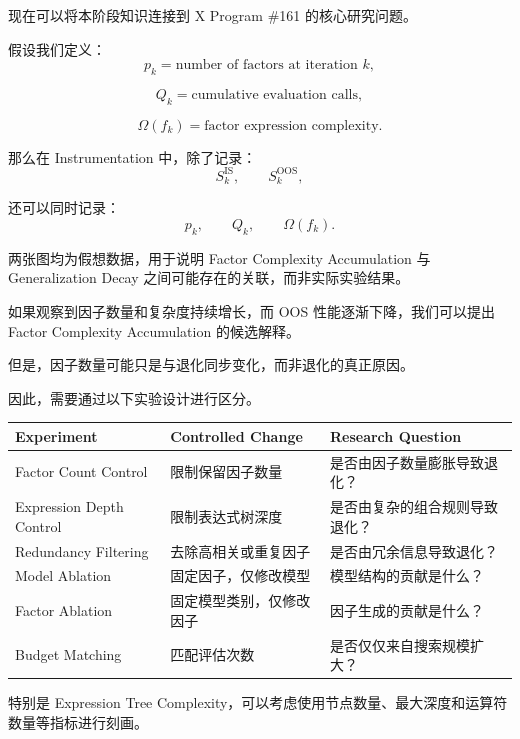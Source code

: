 现在可以将本阶段知识连接到 X Program \#161 的核心研究问题。

假设我们定义：
\[p_k=\text{number of factors at iteration }k,\]

\[Q_k=\text{cumulative evaluation calls},\]

\[\Omega(f_k)=\text{factor expression complexity}.\]

那么在 Instrumentation 中，除了记录：
\[S_k^{\mathrm{IS}},
\qquad
S_k^{\mathrm{OOS}},\]

还可以同时记录：
\[p_k,\qquad Q_k,\qquad\Omega(f_k).\]



两张图均为假想数据，用于说明 Factor Complexity Accumulation 与 Generalization Decay 之间可能存在的关联，而非实际实验结果。

如果观察到因子数量和复杂度持续增长，而 OOS 性能逐渐下降，我们可以提出 Factor Complexity Accumulation 的候选解释。

但是，因子数量可能只是与退化同步变化，而非退化的真正原因。

因此，需要通过以下实验设计进行区分。

\begin{readertable}
\begin{longtable}[]{@{}
  >{\raggedright\arraybackslash}p{}
  >{\raggedright\arraybackslash}p{}
  >{\raggedright\arraybackslash}p{}@{}}
\toprule
Experiment & Controlled Change & Research Question \\
\midrule
\endhead
Factor Count Control & 限制保留因子数量 & 是否由因子数量膨胀导致退化？ \\
Expression Depth Control & 限制表达式树深度 & 是否由复杂的组合规则导致退化？ \\
Redundancy Filtering & 去除高相关或重复因子 & 是否由冗余信息导致退化？ \\
Model Ablation & 固定因子，仅修改模型 & 模型结构的贡献是什么？ \\
Factor Ablation & 固定模型类别，仅修改因子 & 因子生成的贡献是什么？ \\
Budget Matching & 匹配评估次数 & 是否仅仅来自搜索规模扩大？ \\
\bottomrule
\end{longtable}
\end{readertable}

特别是 Expression Tree Complexity，可以考虑使用节点数量、最大深度和运算符数量等指标进行刻画。

